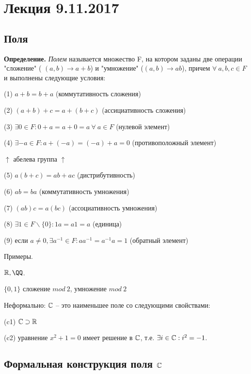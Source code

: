\section{Лекция 9.11.2017}

\subsection{Поля}

\textbf{Определение.} \textit{Полем} называется множество F, на котором заданы две операции "сложение" ( $(a,b) \rightarrow a+b$) и "умножение" ($(a,b) \rightarrow ab$), причем $\forall \ a, b, c \in F$ и выполнены следующие условия:

(1) $a+b = b+a$ (коммутативность сложения)

(2) $(a+b)+c = a+(b+c)$ (ассициативность сложения)

(3) $\exists 0 \in F: 0 + a = a+ 0 = a \ \forall \ a \in F$ (нулевой элемент)

(4) $\exists -a \in F: a+(-a)=(-a)+a=0$ (противоположный элемент)

$\uparrow$ абелева группа $\uparrow$

(5) $a(b+c) = ab + ac$ (дистрибутивность)

(6) $ab=ba$ (коммутативность умножения)

(7) $(ab)c=a(bc)$ (ассоциативность умножения)

(8) $ \exists 1 \in F \backslash \{0\} : 1a=a1=a$ (единица)

(9) если $a \neq 0, \exists a^{-1} \in F: aa^{-1} = a^{-1} a = 1$ (обратный элемент)

\vspace{\baselineskip}
Примеры. 

$\RR, \QQ$.

$\{0, 1\}$ сложение $mod \ 2$, умножение $mod \ 2$

\vspace{\baselineskip}
Неформально: $\mathbb{C}$ -- это наименьшее поле со следующими свойствами:

(c1) $\mathbb{C} \supset \mathbb{R}$

(c2) уравнение $x^2 + 1 = 0$ имеет решение в $\mathbb{C}$, т.е. $\exists i \in \mathbb{C}: i^2 = -1$.

\vspace{\baselineskip}
\subsection{Формальная конструкция поля $\mathbb{C}$}

